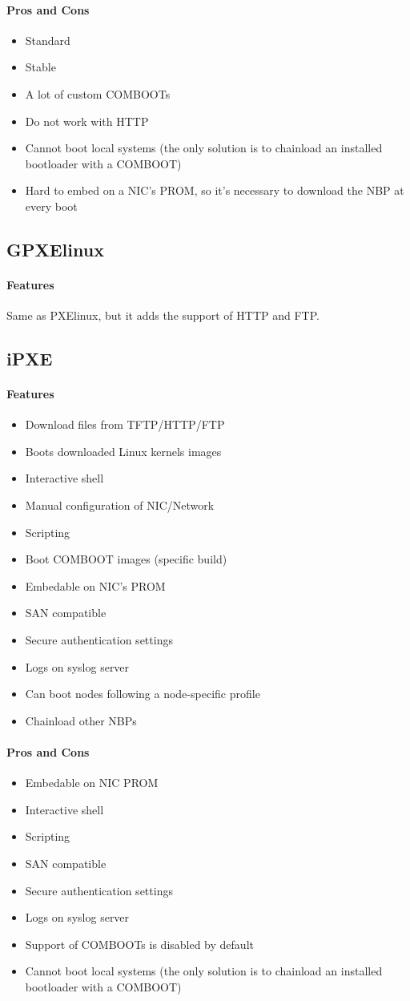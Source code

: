 \documentclass[a4paper,11pt]{article}
\newcommand{\pro} {\item[$\oplus$]}
\newcommand{\con} {\item[$\ominus$]}
\begin{document}
\paragraph{Pros and Cons}
\begin{itemize}
  \pro Standard
  \pro Stable
  \pro A lot of custom COMBOOTs
  \con Do not work with HTTP
  \con Cannot boot local systems (the only solution is to chainload an installed bootloader with a COMBOOT)
  \con Hard to embed on a NIC's PROM, so it's necessary to download the NBP at every boot
\end{itemize}

\subsection{GPXElinux}
\paragraph{Features}
Same as PXElinux, but it adds the support of HTTP and FTP.
\newpage

\subsection{iPXE}
\paragraph{Features}
\begin{itemize}
  \item Download files from TFTP/HTTP/FTP
  \item Boots downloaded Linux kernels images
  \item Interactive shell
  \item Manual configuration of NIC/Network
  \item Scripting
  \item Boot COMBOOT images (specific build)
  \item Embedable on NIC's PROM
  \item SAN compatible
  \item Secure authentication settings
  \item Logs on syslog server
  \item Can boot nodes following a node-specific profile
  \item Chainload other NBPs
\end{itemize}
\paragraph{Pros and Cons}
\begin{itemize}
  \pro Embedable on NIC PROM
  \pro Interactive shell
  \pro Scripting
  \pro SAN compatible
  \pro Secure authentication settings
  \pro Logs on syslog server
  \con Support of COMBOOTs is disabled by default
  \con Cannot boot local systems (the only solution is to chainload an installed bootloader with a COMBOOT)
\end{itemize}
\newpage
\end{document}
